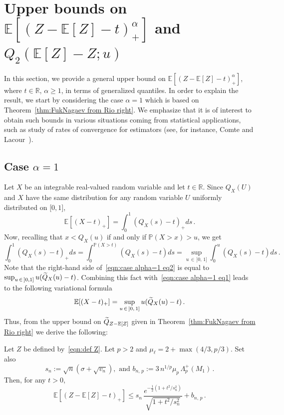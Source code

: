 \documentclass[10pt]{amsart}
\theoremstyle{definition}\newtheorem{defi}[theo]{Definition}\newtheorem{rema}[theo]{Remark}\newtheorem{exam}[theo]{Example}\newtheorem{exem}[theo]{Example}\newtheorem{nota}[theo]{Notation}
\newcommand{\bE}{\mathbb{E}}
\newcommand{\bP}{\mathbb{P}}
\newcommand{\bR}{\mathbb{R}}
\newcommand{\intervalleff}[2]{\mathopen{[} #1\mathclose{}\mathpunct{},#2\mathclose{]}}
\newcommand{\intervalleof}[2]{\mathopen{]} #1\mathclose{}\mathpunct{},#2\mathclose{]}}
\let\oldtilde\tilde
\renewcommand*{\tilde}[1]{\mathchoice{\widetilde{#1}}{\widetilde{#1}}{\oldtilde{#1}}{\oldtilde{#1}}}
\begin{document}
\section{Upper bounds on \texorpdfstring{$\bE[(Z-\bE[Z]-t)^\alpha_+]$}{} and \texorpdfstring{$Q_2(\bE[Z]-Z;u)$}{}}\label{section:bounds generalized moments}
In this section, we provide a general upper bound on $\bE[(Z-\bE[Z]-t)^\alpha_+]$, where $t\in\bR$, $\alpha\geq 1$, in terms of generalized quantiles. In order to explain the result, we start by considering the case $\alpha=1$ which is based on Theorem~\ref{thm:FukNagaev from Rio right}. We emphasize that it is of interest to obtain such bounds in various situations coming from statistical applications, such as study of rates of convergence for estimators (see, for instance, Comte and Lacour~\cite{CL13}).

\subsection{Case \texorpdfstring{$\alpha=1$}{}}
Let $X$ be an integrable real-valued random variable and let $t\in\bR$. Since $Q_X(U)$ and $X$ have the same distribution for any random variable $U$ uniformly distributed on $\intervalleff 01$,
\begin{equation}\label{eqn:case alpha=1 eq1}
\bE\left[(X-t)_+\right]=\int_0^1(Q_X(s)-t)_+ds\,.
\end{equation}
Now, recalling that $x<Q_X(u)$ if and only if $\bP(X>x)>u$, we get
\begin{equation}\label{eqn:case alpha=1 eq2}
\int_0^1(Q_X(s)-t)_+ds=\int_0^{\bP(X>t)}(Q_X(s)-t)ds=\sup_{u\,\in\,]0,\,1]}\int_0^u(Q_X(s)-t)ds\,.
\end{equation}
Note that the right-hand side of~\eqref{eqn:case alpha=1 eq2} is equal to $\sup_{u\,\in\,\intervalleof 01} u(\tilde Q_X(u)-t)$. Combining this fact with~\eqref{eqn:case alpha=1 eq1} leads to the following variational formula
\begin{equation}\label{eqn:case alpha=1 eq3}
\bE[(X-t)_+]=\sup_{u\,\in\,]0,\,1]} u(\tilde Q_X(u)-t)\,.
\end{equation}
Thus, from the upper bound on $\tilde Q_{Z-\bE[Z]}$ given in Theorem~\ref{thm:FukNagaev from Rio right} we derive the following:

\begin{prop}\label{prop:bound stat appli}
Let $Z$ be defined by~\eqref{eqn:def Z}. Let $p>2$ and $\mu_{\ell}=2+\max(4/3,p/3)$. Set also
\[
s_n:=\sqrt{n}\left(\sigma+\sqrt{v_n}\right),\text{ and } b_{n,\,p}:=3\,n^{1/p}\mu_p\,\Lambda_p^+(M_1)\,.
\]
Then, for any $t>0$,
\[
\bE\left[(Z-\bE[Z]-t)_+\right]\leq s_n\,\frac{e^{-\frac12\left(1+t^2/s_n^2\right)}}{\sqrt{1+t^2/s_n^2}}+b_{n,\,p}\,.
\]
\end{prop}
\end{document}
